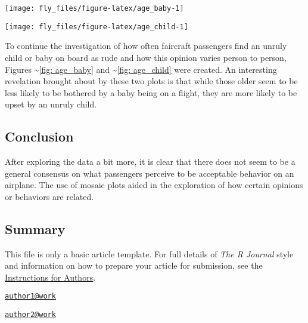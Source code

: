 \begin{Schunk}


\begin{center}\texttt{[image: fly\_files/figure-latex/age\_baby-1]} \end{center}

\end{Schunk}

\begin{Schunk}


\begin{center}\texttt{[image: fly\_files/figure-latex/age\_child-1]} \end{center}

\end{Schunk}

To continue the investigation of how often faircraft passengers find an
unruly child or baby on board as rude and how this opinion varies person
to person, Figures \textasciitilde{}\ref{fig: age_baby} and
\textasciitilde{}\ref{fig: age_child} were created. An interesting
revelation brought about by these two plots is that while those older
seem to be less likely to be bothered by a baby being on a flight, they
are more likely to be upset by an unruly child.

\subsection{Conclusion}\label{conclusion}

After exploring the data a bit more, it is clear that there does not
seem to be a general consensus on what passengers perceive to be
acceptable behavior on an airplane. The use of mosaic plots aided in the
exploration of how certain opinions or behaviors are related.

\subsection{Summary}\label{summary}

This file is only a basic article template. For full details of
\emph{The R Journal} style and information on how to prepare your
article for submission, see the
\href{https://journal.r-project.org/share/author-guide.pdf}{Instructions
for Authors}.



\address{%
Haley Jeppson\\
Iowa State University\\
line 1\\ line 2\\
}
\href{mailto:author1@work}{\nolinkurl{author1@work}}

\address{%
Heike Hofmann\\
Iowa State University\\
line 1\\ line 2\\
}
\href{mailto:author2@work}{\nolinkurl{author2@work}}

